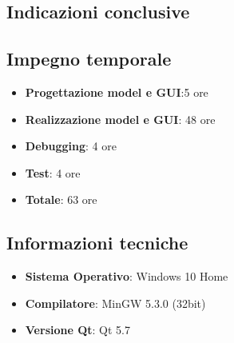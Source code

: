 \begin{appendices}
\section{Indicazioni conclusive}

	\subsection{Impegno temporale}
		\begin{itemize}
		\item \textbf{Progettazione model e GUI}:5 ore
		
		\item \textbf{Realizzazione model e GUI}: 48 ore 
		
		\item \textbf{Debugging}: 4 ore
		
		\item \textbf{Test}: 4 ore
		\item \textbf{Totale}: 63 ore
		\end{itemize}

	\subsection{Informazioni tecniche}
		\begin{itemize}
		\item \textbf{Sistema Operativo}: Windows 10 Home
		\item \textbf{Compilatore}: MinGW 5.3.0 (32bit)
		\item \textbf{Versione Qt}: Qt 5.7
		\end{itemize}
\end{appendices}
